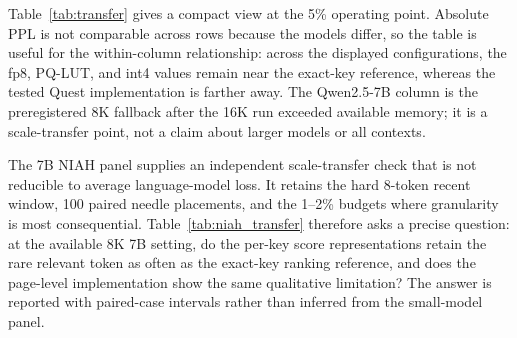\documentclass[sigplan,anonymous,review,nonacm]{acmart}
\begin{document}
Table~\ref{tab:transfer} gives a compact view at the 5\% operating point. Absolute
PPL is not comparable across rows because the models differ, so the table is useful
for the within-column relationship: across the displayed configurations, the fp8,
PQ-LUT, and int4 values remain near the exact-key reference, whereas the tested Quest
implementation is farther away. The Qwen2.5-7B column is the preregistered 8K
fallback after the 16K run exceeded available memory; it is a scale-transfer point,
not a claim about larger models or all contexts.

\begin{table}[!ht]
\centering\footnotesize
\caption{Selection transfer at a 5\% budget. PPL is shown separately for each
model/context; compare methods within a column, not absolute values across columns.
Q0.5B/Q1.5B/Q3B are Qwen2.5 at 16K, L3B is Llama-3.2-3B at 16K, and
$^\dagger$Q7B is Qwen2.5-7B at the preregistered 8K fallback.}
\label{tab:transfer}

\end{table}

The 7B NIAH panel supplies an independent scale-transfer check that is not reducible
to average language-model loss. It retains the hard 8-token recent window, 100 paired
needle placements, and the 1--2\% budgets where granularity is most consequential.
Table~\ref{tab:niah_transfer} therefore asks a precise question: at the available 8K
7B setting, do the per-key score representations retain the rare relevant token as
often as the exact-key ranking reference, and does the page-level implementation
show the same qualitative limitation? The answer is reported with paired-case
intervals rather than inferred from the small-model panel.

\begin{table}[t]
\centering\footnotesize
\caption{Hard NIAH scale-transfer panel (Qwen2.5-7B, 8K, recent window 8): retrieval
rate with 95\% paired bootstrap intervals over 100 cases. This is a 7B validation at
the available context, not a claim of general downstream-task coverage.}
\label{tab:niah_transfer}

\end{table}


\begin{table}[t]
\centering\small
\caption{Capacity and one selection--compression composition point
(Qwen2.5-0.5B, Wikitext-2 for PPL). Left: maximum decode batch on the 20\,GB GPU.
Right: selection and attention representations at the same 5\% budget.}
\label{tab:capacity_compose}

\end{table}
\end{document}

